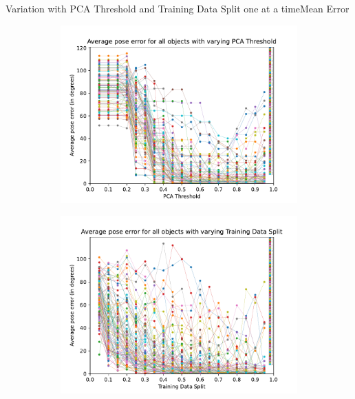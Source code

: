 \documentclass[aspectratio=169, handout, 10pt, hyperref=colorlinks]{beamer}
\begin{document}
\begin{frame}{Variation with PCA Threshold and Training Data Split one at a time}{Mean Error}
    \begin{figure}
        \centering
        \begin{subfigure}{0.48\linewidth}
            \centering
            \includegraphics[width=\linewidth]{pca/mean_error_all_objects.pdf}
        \end{subfigure}
        \begin{subfigure}{0.48\linewidth}
            \centering
            \includegraphics[width=\linewidth]{tds/mean_error_all_objects.pdf}
        \end{subfigure}
    \end{figure}
\end{frame}
\end{document}
